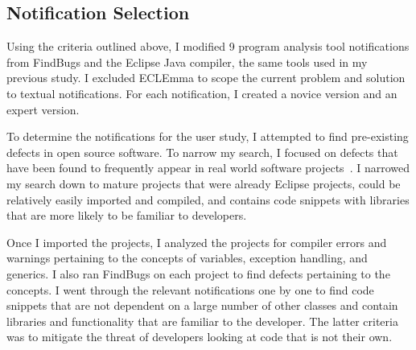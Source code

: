 



\subsection{Notification Selection}

Using the criteria outlined above, I modified 9 program analysis tool notifications from FindBugs and the Eclipse Java compiler, the same tools used in my previous study. I excluded ECLEmma to scope the current problem and solution to textual notifications. For each notification, I created a novice version and an expert version.

To determine the notifications for the user study, I attempted to find pre-existing defects in open source software. To narrow my search, I focused on defects that have been found to frequently appear in real world software projects~\cite{ayewah2010google}. 
I narrowed my search down to mature projects that were already Eclipse projects, could be relatively easily imported and compiled, and contains code snippets with libraries that are more likely to be familiar to developers.

Once I imported the projects, I analyzed the projects for compiler errors and warnings pertaining to the concepts of variables, exception handling, and generics.
I also ran FindBugs on each project to find defects pertaining to the concepts.
I went through the relevant notifications one by one to find code snippets that are not dependent on a large number of other classes and contain libraries and functionality that are familiar to the developer. The latter criteria was to mitigate the threat of developers looking at code that is not their own.

